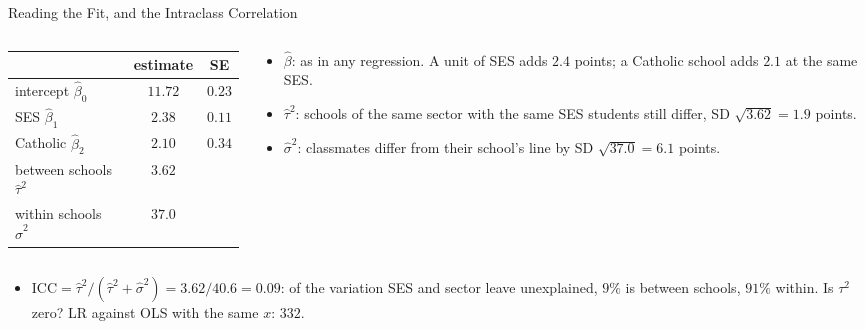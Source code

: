 \documentclass[aspectratio=169,11pt,xcolor=dvipsnames]{beamer}
\newcommand{\core}{\,\raisebox{0.6pt}{\textcolor{corestar}{$\bigstar$}}}
\begin{document}
\begin{frame}{Reading the Fit, and the Intraclass Correlation\core}
\begin{columns}[c]
\begin{column}{0.46\textwidth}
\centering\small
\renewcommand{\arraystretch}{1.05}
\begin{tabular}{lcc}
\toprule
 & estimate & SE \\
\midrule
intercept $\hat\beta_0$ & $11.72$ & $0.23$ \\
SES $\hat\beta_1$ & $2.38$ & $0.11$ \\
Catholic $\hat\beta_2$ & $2.10$ & $0.34$ \\
between schools $\hat\tau^2$ & $3.62$ & \\
within schools $\hat\sigma^2$ & $37.0$ & \\
\bottomrule
\end{tabular}
\end{column}
\begin{column}{0.52\textwidth}
\begin{itemize}\itemsep1pt
  \item $\hat\beta$: as in any regression. A unit of SES adds $2.4$
        points; a Catholic school adds $2.1$ at the same SES.
  \item $\hat\tau^2$: schools of the same sector with the same SES
        students still differ, SD $\sqrt{3.62} = 1.9$ points.
  \item $\hat\sigma^2$: classmates differ from their school's line by
        SD $\sqrt{37.0} = 6.1$ points.
\end{itemize}
\end{column}
\end{columns}
\vskip2pt
\begin{itemize}\itemsep1pt
  \item $\text{ICC} = \hat\tau^2/(\hat\tau^2 + \hat\sigma^2) = 3.62/40.6
       = 0.09$: of the variation SES and sector leave unexplained, $9\%$
        is between schools, $91\%$ within. Is $\tau^2$ zero? LR against
        OLS with the same $x$: $332$.
\end{itemize}
\end{frame}
\end{document}
